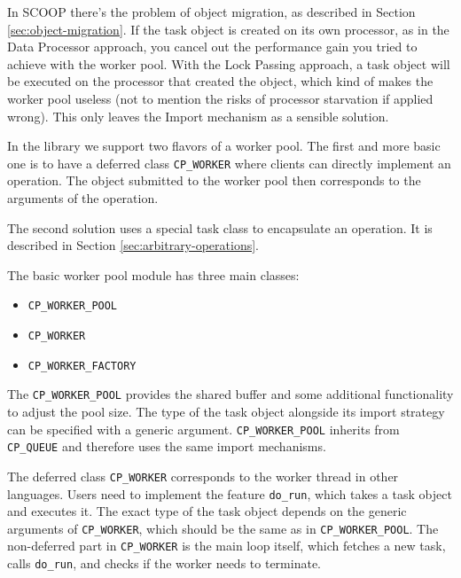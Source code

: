 \documentclass[a4paper,10pt]{article}
\begin{document}
In SCOOP there's the problem of object migration, as described in Section \ref{sec:object-migration}.
If the task object is created on its own processor, as in the Data Processor approach, you cancel out the performance gain you tried to achieve with the worker pool.
With the Lock Passing approach, a task object will be executed on the processor that created the object, which kind of makes the worker pool useless (not to mention the risks of processor starvation if applied wrong).
This only leaves the Import mechanism as a sensible solution.

In the library we support two flavors of a worker pool.
The first and more basic one is to have a deferred class \lstinline!CP_WORKER! where clients can directly implement an operation.
The object submitted to the worker pool then corresponds to the arguments of the operation.

The second solution uses a special task class to encapsulate an operation.
It is described in Section \ref{sec:arbitrary-operations}.


The basic worker pool module has three main classes:
\begin{itemize}
 \item \lstinline!CP_WORKER_POOL!
 \item \lstinline!CP_WORKER!
 \item \lstinline!CP_WORKER_FACTORY!
\end{itemize}

The \lstinline!CP_WORKER_POOL! provides the shared buffer and some additional functionality to adjust the pool size.
The type of the task object alongside its import strategy can be specified with a generic argument.
\lstinline!CP_WORKER_POOL! inherits from \lstinline!CP_QUEUE! and therefore uses the same import mechanisms.

The deferred class \lstinline!CP_WORKER! corresponds to the worker thread in other languages.
Users need to implement the feature \lstinline!do_run!, which takes a task object and executes it.
The exact type of the task object depends on the generic arguments of \lstinline!CP_WORKER!, which should be the same as in \lstinline!CP_WORKER_POOL!.
The non-deferred part in \lstinline!CP_WORKER! is the main loop itself, which fetches a new task, calls \lstinline!do_run!, and checks if the worker needs to terminate.
\end{document}
